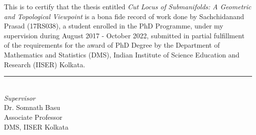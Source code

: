This is to certify that the thesis entitled \textit{Cut Locus of Submanifolds: A Geometric and Topological Viewpoint} is a bona fide record of work done by Sachchidanand Prasad (17RS038),
a student enrolled in the PhD Programme, under my supervision during August 2017 - October 2022, submitted in partial fulfillment of the requirements for the award of PhD Degree by the Department of Mathematics and Statistics (DMS), Indian Institute of Science Education and Research (IISER) Kolkata.
\vspace{2cm}
\begin{flushright}
    \rule{4.5cm}{0.15mm}\\
    \textit{Supervisor}\\
    Dr. Somnath Basu\\
    Associate Professor\\
    DMS, IISER Kolkata
\end{flushright}